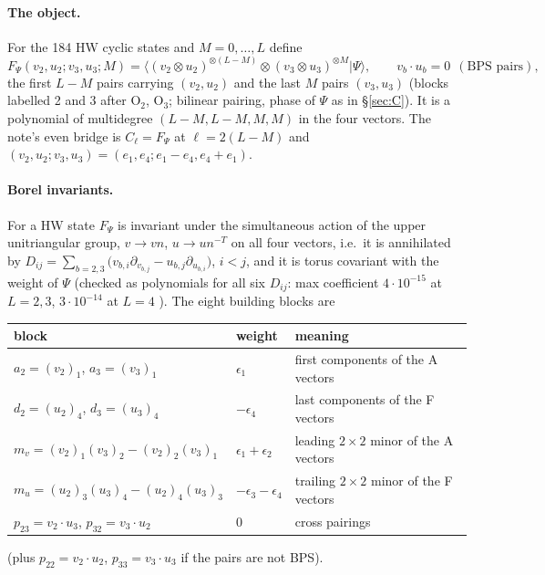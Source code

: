 \paragraph{The object.} For the 184 HW cyclic states and $M=0,\dots,L$ define
\begin{equation}
 F_\Psi(v_2,u_2;v_3,u_3;M)=\big\langle(v_2\otimes u_2)^{\otimes(L-M)}\otimes(v_3\otimes u_3)^{\otimes M}\big|\Psi\big\rangle,\qquad v_b\cdot u_b=0\ \ (\text{BPS pairs}),
\end{equation}
the first $L-M$ pairs carrying $(v_2,u_2)$ and the last $M$ pairs $(v_3,u_3)$ (blocks labelled 2 and 3 after O$_2$, O$_3$; bilinear pairing, phase of $\Psi$ as in \S\ref{sec:C}). It is a polynomial of multidegree
$(L-M,L-M,M,M)$ in the four vectors. The note's even bridge is $C_{\ell}=F_\Psi$ at $\ell=2(L-M)$ and $(v_2,u_2;v_3,u_3)=(e_1,e_4;e_1-e_4,e_4+e_1)$.

\paragraph{Borel invariants.} For a HW state $F_\Psi$ is invariant under the simultaneous action of the upper unitriangular group, $v\to vn$, $u\to un^{-T}$ on all four vectors, i.e.\ it is annihilated by
$D_{ij}=\sum_{b=2,3}\big(v_{b,i}\partial_{v_{b,j}}-u_{b,j}\partial_{u_{b,i}}\big)$, $i<j$, and it is torus covariant with the weight of $\Psi$ (checked as polynomials for all six $D_{ij}$: max coefficient
$4\cdot10^{-15}$ at $L=2,3$, $3\cdot10^{-14}$ at $L=4$ \npy). The eight building blocks are
\begin{center}
\begin{tabular}{lll}
\toprule
block & weight & meaning\\
\midrule
$a_2=(v_2)_1$, $a_3=(v_3)_1$ & $\epsilon_1$ & first components of the A vectors\\
$d_2=(u_2)_4$, $d_3=(u_3)_4$ & $-\epsilon_4$ & last components of the F vectors\\
$m_v=(v_2)_1(v_3)_2-(v_2)_2(v_3)_1$ & $\epsilon_1+\epsilon_2$ & leading $2\times2$ minor of the A vectors\\
$m_u=(u_2)_3(u_3)_4-(u_2)_4(u_3)_3$ & $-\epsilon_3-\epsilon_4$ & trailing $2\times2$ minor of the F vectors\\
$p_{23}=v_2\cdot u_3$, $p_{32}=v_3\cdot u_2$ & 0 & cross pairings\\
\bottomrule
\end{tabular}
\end{center}
(plus $p_{22}=v_2\cdot u_2$, $p_{33}=v_3\cdot u_3$ if the pairs are not BPS).

